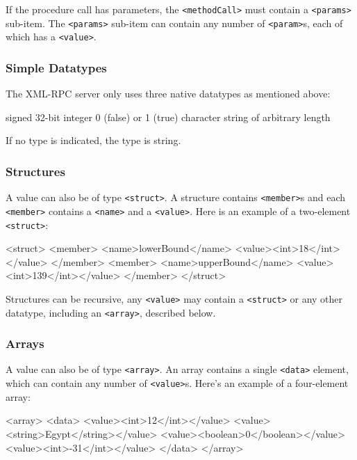 If the procedure call has parameters, the \verb,<methodCall>, must contain a
\verb,<params>, sub-item. The \verb,<params>, sub-item can contain any
number of \verb,<param>,s, each of which has a \verb,<value>,.


\subsubsection{Simple Datatypes}

The XML-RPC server only uses three native datatypes as mentioned above:

\begin{labeling}{}
 signed 32-bit integer
 0 (false) or 1 (true)
 character string of arbitrary length
\end{labeling}

If no type is indicated, the type is string.


\subsubsection{Structures}

A value can also be of type \verb,<struct>,. A structure contains
\verb,<member>,s and each \verb,<member>, contains a \verb,<name>, and a
\verb,<value>,. Here is an example of a two-element \verb,<struct>,:

\begin{lstverbatim}
<struct>
  <member>
    <name>lowerBound</name>
    <value><int>18</int></value>
  </member>
  <member>
    <name>upperBound</name>
    <value><int>139</int></value>
  </member>
</struct>
\end{lstverbatim}

Structures can be recursive, any \verb,<value>, may contain a
\verb,<struct>, or any other datatype, including an \verb,<array>,,
described below.


\subsubsection{Arrays}

A value can also be of type \verb,<array>,. An array contains a single
\verb,<data>, element, which can contain any number of \verb,<value>,s. Here's
an example of a four-element array:

\begin{lstverbatim}
<array>
  <data>
    <value><int>12</int></value>
    <value><string>Egypt</string></value>
    <value><boolean>0</boolean></value>
    <value><int>-31</int></value>
  </data>
</array>
\end{lstverbatim}

